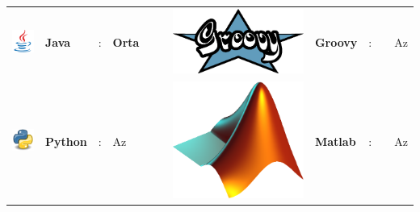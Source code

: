 \documentclass[paper=a4,fontsize=11pt]{temp} %
\begin{document}
\begin{minipage}[t]{0.66\textwidth}
\begin{tabular}{lllllllllll}
\includegraphics[scale=0.05]{IMG/languages/java} & \textbf{Java}     & : & \textbf{Orta}   &  &  & \includegraphics[scale=0.04]{IMG/languages/groovy} & \textbf{Groovy}     & : &  & Az \\
\includegraphics[scale=0.05]{IMG/languages/python} & \textbf{Python}   & : & Az  &  &  & \includegraphics[scale=0.015]{IMG/languages/matlab} & \textbf{Matlab}     & : &  & Az
\end{tabular}

\end{minipage} \\\\\\
\end{document}
